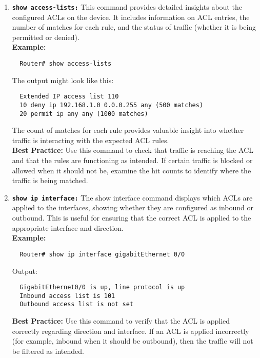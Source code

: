 \documentclass[11pt,a4paper]{article}
\begin{document}
    \begin{enumerate}
        \item \textbf{\lstinline{show access-lists:}} This command provides detailed insights about the configured ACLs on the device. It includes information on ACL entries, the number of matches for each rule, and the status of traffic (whether it is being permitted or denied).
        \\[1em]
        \textbf{Example:}
\begin{lstlisting}
  Router# show access-lists                                           
\end{lstlisting}
        The output might look like this:
\begin{lstlisting}
  Extended IP access list 110
  10 deny ip 192.168.1.0 0.0.0.255 any (500 matches)
  20 permit ip any any (1000 matches)                  
\end{lstlisting}
        The count of matches for each rule provides valuable insight into whether traffic is interacting with the expected ACL rules.
        \\[1em]
        \textbf{Best Practice:} Use this command to check that traffic is reaching the ACL and that the rules are functioning as intended. If certain traffic is blocked or allowed when it should not be, examine the hit counts to identify where the traffic is being matched.

        \item \textbf{\lstinline{show ip interface:}} The show interface command displays which ACLs are applied to the interfaces, showing whether they are configured as inbound or outbound. This is useful for ensuring that the correct ACL is applied to the appropriate interface and direction.
        \\[1em]
        \textbf{Example:}
\begin{lstlisting}
  Router# show ip interface gigabitEthernet 0/0                                         
\end{lstlisting}
        Output:
\begin{lstlisting}
  GigabitEthernet0/0 is up, line protocol is up
  Inbound access list is 101
  Outbound access list is not set                   
\end{lstlisting}
        \textbf{Best Practice:} Use this command to verify that the ACL is applied correctly regarding direction and interface. If an ACL is applied incorrectly (for example, inbound when it should be outbound), then the traffic will not be filtered as intended.


\end{enumerate}
\end{document}
